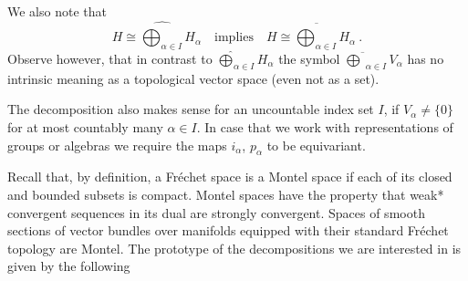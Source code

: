 \documentclass[10]{amsart}
\theoremstyle{remark}
\theoremstyle{definition}
\numberwithin{equation}{section}
\begin{document}
{We also note that  
$$  H\cong \widehat{\bigoplus_{\alpha\in I}} H_\alpha\quad \mbox{implies}\quad  H\cong \overline{\bigoplus_{\alpha\in I}} H_\alpha\ . $$
Observe however, that in contrast to  $\widehat{\bigoplus}_{\alpha\in I} H_\alpha$ the symbol $\overline{\bigoplus}_{\alpha\in I} V_\alpha$ has no intrinsic meaning
as a topological vector space (even not as a set).

The decomposition also makes sense for an uncountable index set $I$, if  $V_\alpha\ne\{0\}$ for at most countably many
$\alpha\in I$. In case that we work with representations of groups or algebras we require the maps $i_\alpha$, $p_\alpha$ to
be equivariant.

Recall that, by definition, a Fr\'echet space is a Montel space if each of its closed and bounded subsets is compact. Montel spaces have the property that weak* convergent sequences in its dual
are strongly convergent. Spaces of smooth sections of  vector bundles over manifolds equipped with their standard Fr\'echet topology are Montel.
The prototype of the decompositions we are interested in is given by the following

}
\end{document}
